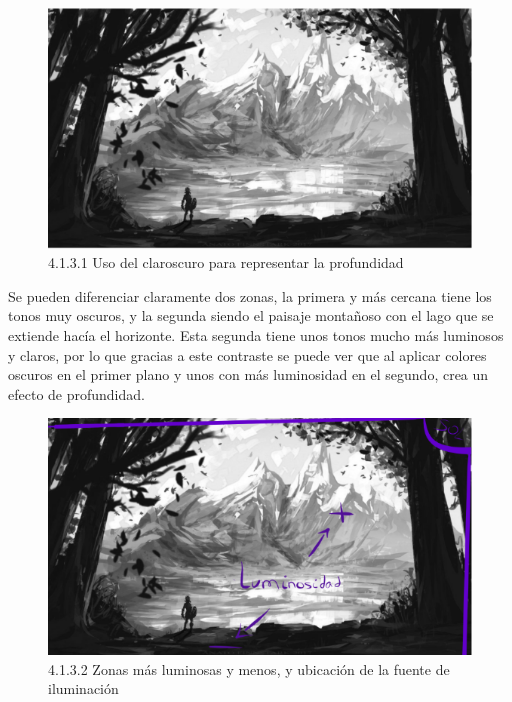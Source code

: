 \documentclass[12pt]{article}
\begin{document}
        
    \begin{figure}[H]
      \centering
      \includegraphics[width=\textwidth]{images/Nerea/Nerea Zelda concept 131.PNG}
      \caption{\small 4.1.3.1 Uso del claroscuro para representar la profundidad}
    \end{figure}

    Se pueden diferenciar claramente dos zonas, la primera y más cercana tiene los tonos muy oscuros, y la segunda siendo el paisaje montañoso con el lago que se extiende hacía el horizonte. Esta segunda tiene unos tonos mucho más luminosos y claros, por lo que gracias a este contraste se puede ver que al aplicar colores oscuros en el primer plano y unos con más luminosidad en el segundo, crea un efecto de profundidad.

    \begin{figure}[H]
      \centering
      \includegraphics[width=\textwidth]{images/Nerea/Nerea Zelda concept 132.PNG}
      \caption{\small 4.1.3.2 Zonas más luminosas y menos, y ubicación de la fuente de iluminación}
    \end{figure}
\end{document}
